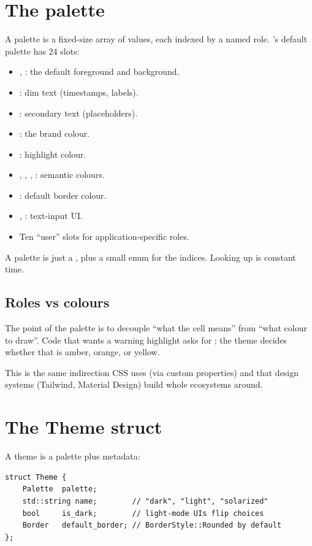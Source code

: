 \section{The palette}

A palette is a fixed-size array of  values, each
indexed by a named role. \maya{}'s default palette has 24 slots:

\begin{itemize}[leftmargin=*]
  \item {}, : the default
    foreground and background.
  \item {}: dim text (timestamps, labels).
  \item {}: secondary text (placeholders).
  \item {}: the brand colour.
  \item {}: highlight colour.
  \item {}, , ,
    : semantic colours.
  \item {}: default border colour.
  \item {}, : text-input UI.
  \item Ten ``user'' slots for application-specific roles.
\end{itemize}

A palette is just a , plus a small
enum for the indices. Looking up is constant time.

\subsection*{Roles vs colours}

The point of the palette is to decouple ``what the cell means''
from ``what colour to draw''. Code that wants a warning highlight
asks for ; the theme decides whether that
is amber, orange, or yellow.

This is the same indirection CSS uses (via custom properties) and
that design systems (Tailwind, Material Design) build whole
ecosystems around.

\section{The Theme struct}

A theme is a palette plus metadata:

\begin{lstlisting}
struct Theme {
    Palette  palette;
    std::string name;        // "dark", "light", "solarized"
    bool     is_dark;        // light-mode UIs flip choices
    Border   default_border; // BorderStyle::Rounded by default
};
\end{lstlisting}

